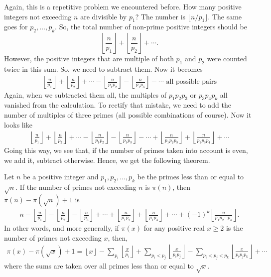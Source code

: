 \documentclass{subfiles}
\begin{document}
		Again, this is a repetitive problem we encountered before. How many positive integers not exceeding $n$ are divisible by $p_1$? The number is $\lfloor {n}/{p_1}\rfloor$. The same goes for $p_2,\ldots,p_k$. So, the total number of non-prime positive integers should be \[\left\lfloor\frac{n}{p_1}\right\rfloor+\left\lfloor\frac{n}{p_2}\right\rfloor+\cdots.\] However, the positive integers that are multiple of both $p_1$ and $p_2$ were counted twice in this sum. So, we need to subtract them. Now it becomes
			\begin{align*}
				\left\lfloor\frac{n}{p_1}\right\rfloor+\left\lfloor\frac{n}{p_2}\right\rfloor+\cdots-\left\lfloor\frac{n}{p_1p_2}\right\rfloor-\left\lfloor\frac{n}{p_1p_3}\right\rfloor-\cdots \mbox{ all possible pairs}
			\end{align*}
		Again, when we subtracted them all, the multiples of $p_1p_2p_3$ or $p_3p_4p_k$ all vanished from the calculation. To rectify that mistake, we need to add the number of multiples of three primes (all possible combinations of course). Now it looks like
			\begin{align*}
				\left\lfloor\frac{n}{p_1}\right\rfloor+\left\lfloor\frac{n}{p_2}\right\rfloor+\cdots-\left\lfloor\frac{n}{p_1p_2}\right\rfloor-\left\lfloor\frac{n}{p_1p_3}\right\rfloor-\cdots+\left\lfloor\frac{n}{p_1p_2p_3}\right\rfloor+\left\lfloor\frac{n}{p_1p_3p_4}\right\rfloor+\cdots
			\end{align*}
		Going this way, we see that, if the number of primes taken into account is even, we add it, subtract otherwise. Hence, we get the following theorem.
			\begin{theorem}\label{thm:numofprime}
	Let $n$ be a positive integer and $p_1,p_2,\ldots,p_k$ be the primes less than or equal to $\sqrt{n}$. If the number of primes not exceeding $n$ is $\pi(n)$, then $\pi(n) -\pi(\sqrt{n})+1$ is
	\begin{align}
		n-\left\lfloor\frac{n}{p_1}\right\rfloor-\left\lfloor\frac{n}{p_2}\right\rfloor-\left\lfloor\frac{n}{p_3}\right\rfloor+\cdots+\left\lfloor\frac{n}{p_1p_2}\right\rfloor+\left\lfloor\frac{n}{p_1p_3}\right\rfloor+\cdots+(-1)^k\left\lfloor\frac{n}{p_1p_2\cdots p_k}\right\rfloor. \label{eq:tau(n)-tau(sqrt(n))+1}
	\end{align}
	In other words, and more generally, if $\pi(x)$ for any positive real $x \geq 2$ is the number of primes not exceeding $x$, then,
	\begin{align}
		\pi(x) -\pi(\sqrt{x})+1 = \left\lfloor x \right\rfloor - \sum_{p_i} \left\lfloor \frac{x}{p_i} \right\rfloor + \sum_{p_i < p_j} \left\lfloor \frac{x}{p_ip_j} \right\rfloor - \sum_{p_i < p_j < p_k} \left\lfloor \frac{x}{p_ip_jp_k} \right\rfloor + \cdots
	\end{align}
	where the sums are taken over all primes less than or equal to $\sqrt x$.
	\end{theorem}
\end{document}
